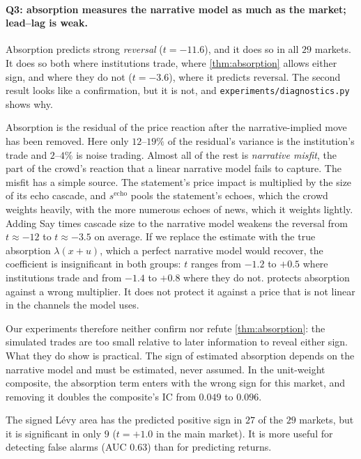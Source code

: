 \documentclass[11pt,a4paper]{article}
\theoremstyle{plain}
\theoremstyle{definition}
\theoremstyle{remark}
\begin{document}
\paragraph{Q3: absorption measures the narrative model as much as the market; lead--lag is weak.} Absorption predicts strong \emph{reversal} ($t=-11.6$), and it does so in all $29$ markets. It does so both where institutions trade, where \cref{thm:absorption} allows either sign, and where they do not ($t=-3.6$), where it predicts reversal. The second result looks like a confirmation, but it is not, and \texttt{experiments/diagnostics.py} shows why.

Absorption is the residual of the price reaction after the narrative-implied move has been removed. Here only $12$--$19\%$ of the residual's variance is the institution's trade and $2$--$4\%$ is noise trading. Almost all of the rest is \emph{narrative misfit}, the part of the crowd's reaction that a linear narrative model fails to capture. The misfit has a simple source. The statement's price impact is multiplied by the size of its echo cascade, and $s^{\text{echo}}$ pools the statement's echoes, which the crowd weights heavily, with the more numerous echoes of news, which it weights lightly. Adding Say times cascade size to the narrative model weakens the reversal from $t\approx-12$ to $t\approx-3.5$ on average. If we replace the estimate with the true absorption $\lambda(x+u)$, which a perfect narrative model would recover, the coefficient is insignificant in both groups: $t$ ranges from $-1.2$ to $+0.5$ where institutions trade and from $-1.4$ to $+0.8$ where they do not.  protects absorption against a wrong multiplier. It does not protect it against a price that is not linear in the channels the model uses.

Our experiments therefore neither confirm nor refute \cref{thm:absorption}: the simulated trades are too small relative to later information to reveal either sign. What they do show is practical. The sign of estimated absorption depends on the narrative model and must be estimated, never assumed. In the unit-weight composite, the absorption term enters with the wrong sign for this market, and removing it doubles the composite's IC from $0.049$ to $0.096$.

The signed L\'evy area has the predicted positive sign in $27$ of the $29$ markets, but it is significant in only $9$ ($t=+1.0$ in the main market). It is more useful for detecting false alarms (AUC $0.63$) than for predicting returns.
\end{document}
